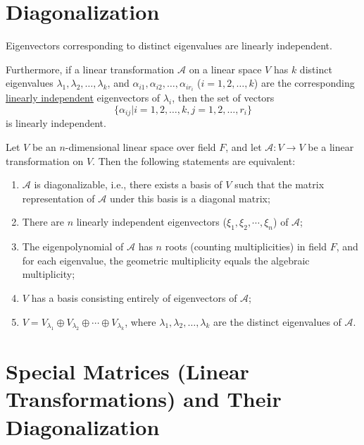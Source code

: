 \documentclass[11pt]{../../TexTemplate/elegantbook} %
\begin{document}
\section{Diagonalization}
\begin{lemma}
    Eigenvectors corresponding to distinct eigenvalues are linearly independent.

    Furthermore, if a linear transformation \( \mathcal{A} \) on a linear space \( V \)
    has \( k \) distinct eigenvalues \( \lambda_1, \lambda_2, \dots, \lambda_k \),
    and \( \alpha_{i1}, \alpha_{i2}, \dots, \alpha_{ir_{i}} \) (\(i = 1, 2, \dots, k\)) 
    are the corresponding \underline{linearly independent} eigenvectors of \( \lambda_i \),
    then the set of vectors
    \[
    \{ \alpha_{ij} | i = 1, 2, \dots, k, j = 1, 2, \dots, r_i \}
    \]
    is linearly independent.
\end{lemma}

\begin{theorem}
    Let \( V \) be an \( n \)-dimensional linear space over field \( F \),
    and let \( \mathcal{A}: V \to V \) be a linear transformation on \( V \).
    Then the following statements are equivalent:
    \begin{enumerate}
        \item \( \mathcal{A} \) is diagonalizable, i.e., there exists a basis of \( V \)
            such that the matrix representation of \( \mathcal{A} \) under this basis is a diagonal matrix;
        \item There are \( n \) linearly independent eigenvectors (\( \xi_{1}, \xi_{2}, \cdots, \xi_{n} \)) of \( \mathcal{A} \);
        \item The eigenpolynomial of \( \mathcal{A} \) has \( n \) roots (counting multiplicities) in field \( F \),
            and for each eigenvalue, the geometric multiplicity equals the algebraic multiplicity;
        \item \( V \) has a basis consisting entirely of eigenvectors of \( \mathcal{A} \);
        \item \( V = V_{\lambda_1} \oplus V_{\lambda_2} \oplus \cdots \oplus V_{\lambda_k} \),
            where \( \lambda_1, \lambda_2, \dots, \lambda_k \) are the distinct eigenvalues of \( \mathcal{A} \).
    \end{enumerate}
\end{theorem}

\section{Special Matrices (Linear Transformations) and Their Diagonalization}
\end{document}
